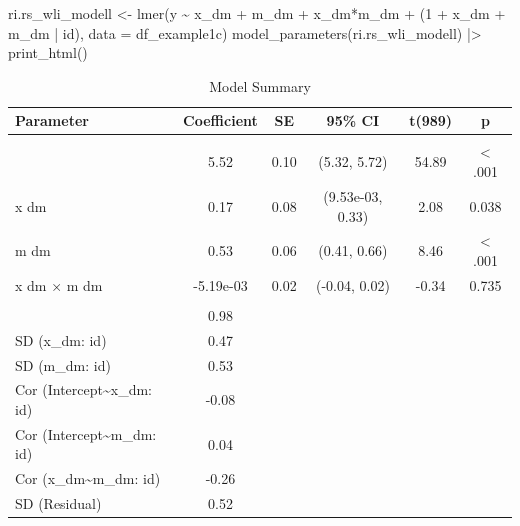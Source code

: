 \documentclass[
  letterpaper,
  DIV=11,
  numbers=noendperiod]{scrreprt}
\newenvironment{Shaded}{\begin{snugshade}}{\end{snugshade}}
\newcommand{\AttributeTok}[1]{\textcolor[rgb]{0.40,0.45,0.13}{#1}}
\newcommand{\DecValTok}[1]{\textcolor[rgb]{0.68,0.00,0.00}{#1}}
\newcommand{\FunctionTok}[1]{\textcolor[rgb]{0.28,0.35,0.67}{#1}}
\newcommand{\NormalTok}[1]{\textcolor[rgb]{0.00,0.23,0.31}{#1}}
\newcommand{\OtherTok}[1]{\textcolor[rgb]{0.00,0.23,0.31}{#1}}
\newcommand{\SpecialCharTok}[1]{\textcolor[rgb]{0.37,0.37,0.37}{#1}}
\begin{document}
\begin{Shaded}
\begin{Highlighting}[]
\NormalTok{ri.rs\_wli\_modell }\OtherTok{\textless{}{-}} \FunctionTok{lmer}\NormalTok{(y }\SpecialCharTok{\textasciitilde{}}\NormalTok{ x\_dm }\SpecialCharTok{+}\NormalTok{ m\_dm }\SpecialCharTok{+}\NormalTok{ x\_dm}\SpecialCharTok{*}\NormalTok{m\_dm }\SpecialCharTok{+}\NormalTok{ (}\DecValTok{1} \SpecialCharTok{+}\NormalTok{ x\_dm }\SpecialCharTok{+}\NormalTok{ m\_dm }\SpecialCharTok{|}\NormalTok{ id), }\AttributeTok{data =}\NormalTok{ df\_example1c)}
\FunctionTok{model\_parameters}\NormalTok{(ri.rs\_wli\_modell) }\SpecialCharTok{|\textgreater{}} \FunctionTok{print\_html}\NormalTok{()}
\end{Highlighting}
\end{Shaded}

\begin{table}
\caption*{
{\large Model Summary}
} 
\fontsize{12.0pt}{14.4pt}\selectfont
\begin{tabular*}{\linewidth}{@{\extracolsep{\fill}}lccccc}
\toprule
Parameter & Coefficient & SE & 95\% CI & t(989) & p \\ 
\midrule\addlinespace[2.5pt]
\multicolumn{6}{l}{{\slshape Fixed Effects }} \\[2.5pt] 
\midrule\addlinespace[2.5pt]
{(Intercept)} & 5.52 & 0.10 & (5.32, 5.72) & 54.89 & < .001 \\ 
{x dm} & 0.17 & 0.08 & (9.53e-03, 0.33) & 2.08 & 0.038  \\ 
{m dm} & 0.53 & 0.06 & (0.41, 0.66) & 8.46 & < .001 \\ 
{x dm × m dm} & -5.19e-03 & 0.02 & (-0.04, 0.02) & -0.34 & 0.735  \\ 
\midrule\addlinespace[2.5pt]
\multicolumn{6}{l}{{\slshape Random Effects }} \\[2.5pt] 
\midrule\addlinespace[2.5pt]
{SD (Intercept: id)} & 0.98 &  &  &  &  \\ 
{SD (x\_dm: id)} & 0.47 &  &  &  &  \\ 
{SD (m\_dm: id)} & 0.53 &  &  &  &  \\ 
{Cor (Intercept\textasciitilde{}x\_dm: id)} & -0.08 &  &  &  &  \\ 
{Cor (Intercept\textasciitilde{}m\_dm: id)} & 0.04 &  &  &  &  \\ 
{Cor (x\_dm\textasciitilde{}m\_dm: id)} & -0.26 &  &  &  &  \\ 
{SD (Residual)} & 0.52 &  &  &  &  \\ 
\bottomrule
\end{tabular*}
\begin{minipage}{\linewidth}
\\
\end{minipage}
\end{table}
\end{document}
